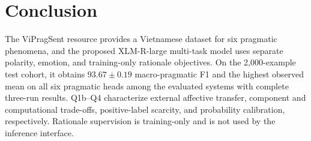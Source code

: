 \section{Conclusion}

The ViPragSent resource provides a Vietnamese dataset for six pragmatic phenomena, and the proposed XLM-R-large multi-task model uses separate polarity, emotion, and training-only rationale objectives. On the 2,000-example test cohort, it obtains $93.67 \pm 0.19$ macro-pragmatic F1 and the highest observed mean on all six pragmatic heads among the evaluated systems with complete three-run results. Q1b--Q4 characterize external affective transfer, component and computational trade-offs, positive-label scarcity, and probability calibration, respectively. Rationale supervision is training-only and is not used by the inference interface.
